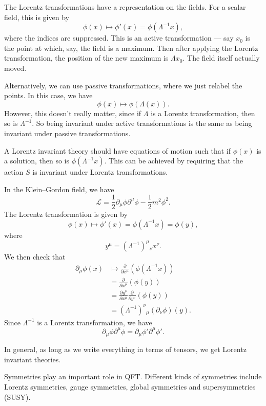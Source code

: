 \documentclass[a4paper]{article}
\begin{document}
The Lorentz transformations have a representation on the fields. For a scalar field, this is given by
\[
  \phi(x) \mapsto \phi'(x) = \phi(\Lambda^{-1}x),
\]
where the indices are suppressed. This is an active transformation --- say $x_0$ is the point at which, say, the field is a maximum. Then after applying the Lorentz transformation, the position of the new maximum is $\Lambda x_0$. The field itself actually moved.

Alternatively, we can use passive transformations, where we just relabel the points. In this case, we have
\[
  \phi(x) \mapsto \phi(\Lambda (x)).
\]
However, this doesn't really matter, since if $\Lambda$ is a Lorentz transformation, then so is $\Lambda^{-1}$. So being invariant under active transformations is the same as being invariant under passive transformations.

A Lorentz invariant theory should have equations of motion such that if $\phi(x)$ is a solution, then so is $\phi(\Lambda^{-1} x)$. This can be achieved by requiring that the action $S$ is invariant under Lorentz transformations.

\begin{eg}
  In the Klein--Gordon field, we have
  \[
    \mathcal{L} = \frac{1}{2} \partial_\mu \phi \partial^\mu \phi - \frac{1}{2}m^2 \phi^2.
  \]
  The Lorentz transformation is given by
  \[
    \phi(x) \mapsto \phi'(x) = \phi(\Lambda^{-1}x) = \phi(y),
  \]
  where
  \[
    y^\mu = (\Lambda^{-1})^\mu\!_\nu x^\nu.
  \]
  We then check that
  \begin{align*}
    \partial_\mu \phi(x) &\mapsto \frac{\partial}{\partial x^\mu}(\phi(\Lambda^{-1}x)) \\
    &= \frac{\partial}{\partial x^\mu} (\phi(y))\\
    &= \frac{\partial y^\nu}{\partial x^\mu} \frac{\partial}{\partial y^\nu} (\phi(y))\\
    &= (\Lambda^{-1})^\nu\!_\mu(\partial_\nu \phi)(y).
  \end{align*}
  Since $\Lambda^{-1}$ is a Lorentz transformation, we have
  \[
    \partial_\mu \phi \partial^\mu \phi = \partial_\mu \phi' \partial^\mu \phi'.
  \]
\end{eg}
In general, as long as we write everything in terms of tensors, we get Lorentz invariant theories.

Symmetries play an important role in QFT. Different kinds of symmetries include Lorentz symmetries, gauge symmetries, global symmetries and supersymmetries (SUSY).
\end{document}
